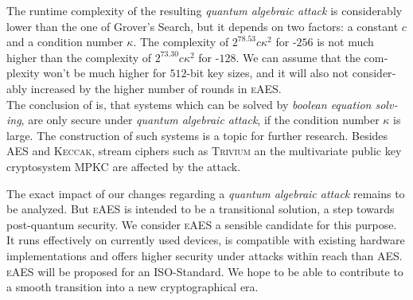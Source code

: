 \documentclass[a4paper,11pt]{article}
\begin{document}
\begin{otherlanguage}{english}
\begin{multicols}{2}
\noindent
The runtime complexity of the resulting \textit{quantum algebraic attack} is considerably lower than the one of Grover's Search, but it depends on two factors: a constant $c$ and a condition number $\kappa$. The complexity of $2^{78.53}c\kappa^2$ for -$256$ is not much higher than the complexity of $2^{73.30}c\kappa^2$ for -$128$. We can assume that the complexity won't be much higher for $512$-bit key sizes, and it will also not considerably increased by the higher number of rounds in \textsc{eAES}.\\

\noindent
The conclusion of \cite{QAA} is, that systems which can be solved by \textit{boolean equation solving}, are only secure under \textit{quantum algebraic attack}, if the condition number $\kappa$ is large. The construction of such systems is a topic for further research. Besides \textsc{AES} and \textsc{Keccak}, stream ciphers such as \textsc{Trivium} an the multivariate public key cryptosystem \textsc{MPKC} are affected by the attack.\\


\vspace{0.1cm}

\noindent
The exact impact of our changes regarding a \textit{quantum algebraic attack} remains to be analyzed. But \textsc{eAES} is intended to be a transitional solution, a step towards post-quantum security. We consider \textsc{eAES} a sensible candidate for this purpose. It runs effectively on currently used devices, is compatible with existing hardware implementations and offers higher security under attacks within reach than \textsc{AES}.\\

\noindent
\textsc{eAES} will be proposed for an ISO-Standard. We hope to be able to contribute to a smooth transition into a new cryptographical era.


\vspace{1cm}




\end{multicols}
\end{otherlanguage}
\end{document}
